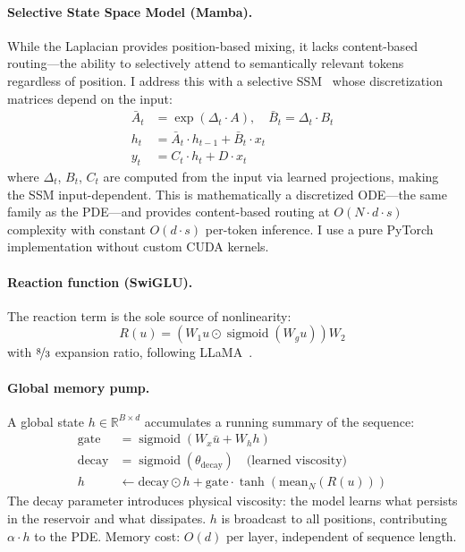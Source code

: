\documentclass{article}
\newcommand{\R}{\mathbb{R}}
\DeclareMathOperator{\sigmoid}{sigmoid}
\begin{document}
\paragraph{Selective State Space Model (Mamba).}
While the Laplacian provides position-based mixing, it lacks content-based routing---the ability to selectively attend to semantically relevant tokens regardless of position. I address this with a selective SSM~\cite{gu2023mamba} whose discretization matrices depend on the input:
\begin{align}
\bar{A}_t &= \exp(\Delta_t \cdot A), \quad \bar{B}_t = \Delta_t \cdot B_t \\
h_t &= \bar{A}_t \cdot h_{t-1} + \bar{B}_t \cdot x_t \\
y_t &= C_t \cdot h_t + D \cdot x_t
\end{align}
where $\Delta_t$, $B_t$, $C_t$ are computed from the input via learned projections, making the SSM input-dependent. This is mathematically a discretized ODE---the same family as the PDE---and provides content-based routing at $O(N \cdot d \cdot s)$ complexity with constant $O(d \cdot s)$ per-token inference. I use a pure PyTorch implementation without custom CUDA kernels.

\paragraph{Reaction function (SwiGLU).}
The reaction term is the sole source of nonlinearity:
\begin{equation}
R(u) = \left(W_1 u \odot \sigmoid(W_g u)\right) W_2
\end{equation}
with $\nicefrac{8}{3}$ expansion ratio, following LLaMA~\cite{touvron2023llama}.

\paragraph{Global memory pump.}
A global state $h \in \R^{B \times d}$ accumulates a running summary of the sequence:
\begin{align}
\text{gate} &= \sigmoid(W_x \bar{u} + W_h h) \\
\text{decay} &= \sigmoid(\theta_{\text{decay}}) \quad \text{(learned viscosity)} \\
h &\leftarrow \text{decay} \odot h + \text{gate} \cdot \tanh(\text{mean}_N(R(u)))
\end{align}
The decay parameter introduces physical viscosity: the model learns what persists in the reservoir and what dissipates. $h$ is broadcast to all positions, contributing $\alpha \cdot h$ to the PDE. Memory cost: $O(d)$ per layer, independent of sequence length.
\end{document}
